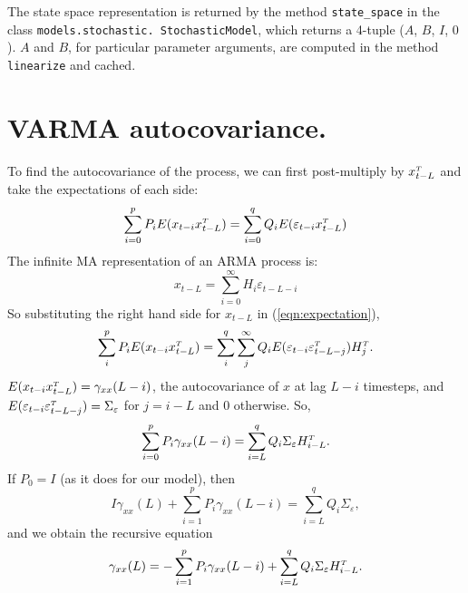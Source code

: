 \documentclass{article}
\begin{document}
The state space representation is returned by the method \texttt{state\_space} in the class \texttt{models.stochastic. StochasticModel}, which returns a 4-tuple ($A$, $B$, $I$, $0$). $A$ and $B$, for particular parameter arguments, are computed in the method \texttt{linearize} and cached.

\section{VARMA autocovariance.}

To find the autocovariance of the process, we can first post-multiply by $x\trans _{t-L}$ and take the expectations of each side:
\begin{equation}
    \sum_{i=0}^p P_i E(x_{t-i} x\trans_{t-L}) = \sum_{i=0}^q Q_i E(\varepsilon_{t-i} x\trans_{t-L})
    \label{eqn:expectation}
\end{equation}
The infinite MA representation of an ARMA process is:
\begin{equation}
    x_{t-L} = \sum_{i=0}^{\infty} H_i \varepsilon_{t-L-i}
\end{equation}
So substituting the right hand side for $x_{t-L}$ in (\ref{eqn:expectation}),
\begin{equation}
    \sum_i^p P_i E(x_{t-i} x\trans_{t-L}) = \sum_i^q \sum_j^{\infty} Q_i E(\varepsilon_{t-i} \varepsilon\trans_{t-L-j}) H\trans_j.
\end{equation}
$E(x_{t-i}x\trans_{t-L}) = \gamma_{xx}(L-i)$, the autocovariance of $x$ at lag $L - i$ timesteps, and $E(\varepsilon_{t-i} \varepsilon\trans_{t-L-j}) = \Sigma_{\varepsilon}$ for $j = i-L$ and $0$ otherwise. So,
\begin{equation}
    \sum_{i=0}^p P_i \gamma_\xx(L-i) = \sum_{i=L}^q Q_i \Sigma_\varepsilon H\trans_{i-L}.
\end{equation}
If $P_0 = I$ (as it does for our model), then
\begin{equation}
    I\gamma_{xx}(L) + \sum^p_{i=1}P_i\gamma_{xx}(L-i)=\sum_{i=L}^q Q_i \Sigma_\varepsilon,
\end{equation}
and we obtain the recursive equation
\begin{equation}
    \gamma_\xx(L) = -\sum^p_{i=1} P_i \gamma_\xx(L-i) + \sum_{i=L}^q Q_i \Sigma_\varepsilon H\trans_{i-L}.
    \label{eqn:recursion}
\end{equation}
\end{document}
